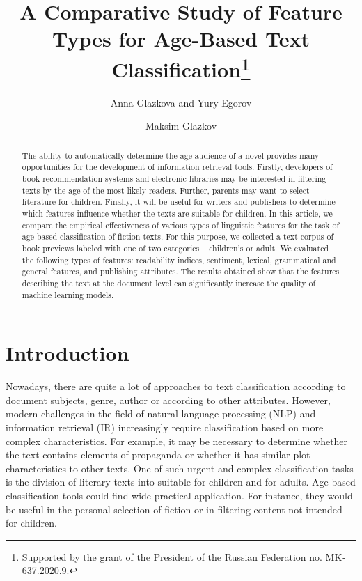 \documentclass[runningheads]{llncs}
\begin{document}
\title{A Comparative Study of Feature Types for Age-Based Text Classification\thanks{Supported by the grant of the President of the Russian Federation no. MK-637.2020.9.}}
\author{Anna Glazkova and
Yury Egorov \and
Maksim Glazkov}
\maketitle              \begin{abstract}
The ability to automatically determine the age audience of a novel provides many opportunities for the development of information retrieval tools. Firstly, developers of book recommendation systems and electronic libraries may be interested in filtering texts by the age of the most likely readers. Further, parents may want to select literature for children. Finally, it will be useful for writers and publishers to determine which features influence whether the texts are suitable for children. In this article, we compare the empirical effectiveness of various types of linguistic features for the task of age-based classification of fiction texts. For this purpose, we collected a text corpus of book previews labeled with one of two categories -- children’s or adult. We evaluated the following types of features: readability indices, sentiment, lexical, grammatical and general features, and publishing attributes. The results obtained show that the features describing the text at the document level can significantly increase the quality of machine learning models.

\end{abstract}
\section{Introduction}
Nowadays, there are quite a lot of approaches to text classification according to document subjects, genre, author or according to other attributes. However, modern challenges in the field of natural language processing (NLP) and information retrieval (IR) increasingly require classification based on more complex characteristics. For example, it may be necessary to determine whether the text contains elements of propaganda or whether it has similar plot characteristics to other texts. One of such urgent and complex classification tasks is the division of literary texts into suitable for children and for adults. Age-based classification tools could find wide practical application. For instance, they would be useful in the personal selection of fiction or in filtering content not intended for children.
\end{document}
